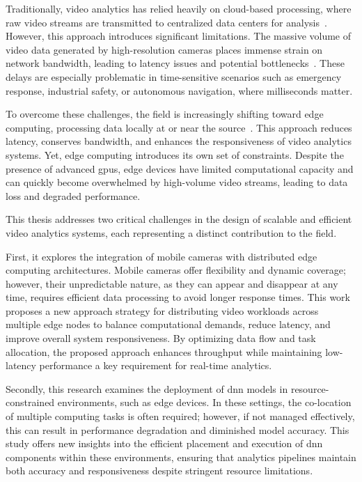 Traditionally, video analytics has relied heavily on cloud-based processing, where raw video streams are transmitted to centralized data centers for analysis~\cite{ao2018sprocket,zhang2017live,fouladi2017encoding}. However, this approach introduces significant limitations. The massive volume of video data generated by high-resolution cameras places immense strain on network bandwidth, leading to latency issues and potential bottlenecks~\cite{chen2015glimpse,hung2018videoedge}. These delays are especially problematic in time-sensitive scenarios such as emergency response, industrial safety, or autonomous navigation, where milliseconds matter.

To overcome these challenges, the field is increasingly shifting toward edge computing, processing data locally at or near the source~\cite{zeng2020distream,jiang2018chameleon,zhang2019hetero}. This approach reduces latency, conserves bandwidth, and enhances the responsiveness of video analytics systems. Yet, edge computing introduces its own set of constraints. Despite the presence of advanced \acrshort{gpu}s, edge devices have limited computational capacity and can quickly become overwhelmed by high-volume video streams, leading to data loss and degraded performance.

This thesis addresses two critical challenges in the design of scalable and efficient video analytics systems, each representing a distinct contribution to the field.

First, it explores the integration of mobile cameras with distributed edge computing architectures. Mobile cameras offer flexibility and dynamic coverage; however, their unpredictable nature, as they can appear and disappear at any time, requires efficient data processing to avoid longer response times. This work proposes a new approach strategy for distributing video workloads across multiple edge nodes to balance computational demands, reduce latency, and improve overall system responsiveness. By optimizing data flow and task allocation, the proposed approach enhances throughput while maintaining low-latency performance a key requirement for real-time analytics.

Secondly, this research examines the deployment of \acrfull{dnn} models in resource-constrained environments, such as edge devices. In these settings, the co-location of multiple computing tasks is often required; however, if not managed effectively, this can result in performance degradation and diminished model accuracy. This study offers new insights into the efficient placement and execution of \acrshort{dnn} components within these environments, ensuring that analytics pipelines maintain both accuracy and responsiveness despite stringent resource limitations.

